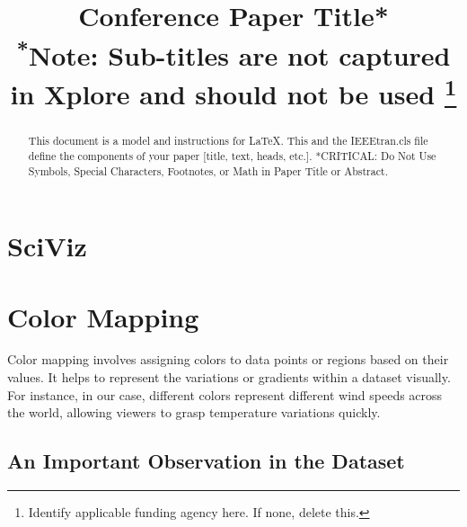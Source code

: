 \documentclass[conference]{IEEEtran}
\begin{document}
\title{Conference Paper Title*\\
{\footnotesize \textsuperscript{*}Note: Sub-titles are not captured in Xplore and
should not be used}
\thanks{Identify applicable funding agency here. If none, delete this.}
}

\author{
\and
{}
\and
{}
}

\maketitle

\begin{abstract}
This document is a model and instructions for \LaTeX.
This and the IEEEtran.cls file define the components of your paper [title, text, heads, etc.]. *CRITICAL: Do Not Use Symbols, Special Characters, Footnotes, 
or Math in Paper Title or Abstract.
\end{abstract}


\section{SciViz}
\section{Color Mapping}

Color mapping involves assigning colors to data points or regions based on their values. It helps to represent the variations or gradients within a dataset visually. For instance, in our case, different colors represent different wind speeds across the world, allowing viewers to grasp temperature variations quickly.

\subsection{An Important Observation in the Dataset}
\end{document}
